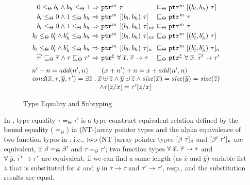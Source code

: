 \begin{DIFnomarkup}
\begin{figure}
{\[\begin{array}{l}
\begin{array}{r@{~}c@{~}l@{~}c@{~}l}
    0\le_{\Theta} b_l \wedge b_h \le_{\Theta} 1 &\Rightarrow& \tptr{\tau}{m}&\sqsubseteq_{\Theta}& \tarrayptr{b_l}{b_h}{\tau}{m}\\[0.2em]
    b_l \le_{\Theta} 0 \wedge 1 \le_{\Theta} b_h &\Rightarrow& \tarrayptr{b_l}{b_h}{\tau}{m} &\sqsubseteq_{\Theta}& \tptr{\tau}{m}\\[0.2em]
    b_l \le_{\Theta} 0 \wedge 1 \le_{\Theta} b_h &\Rightarrow& \tntarrayptr{b_l}{b_h}{\tau}{m} &\sqsubseteq_{\Theta}& \tptr{\tau}{m}\\[0.2em]
    b_l \le_{\Theta} b_l' \wedge b_h' \le_{\Theta} b_h &\Rightarrow& \tntarrayptr{b_l}{b_h}{\tau}{m} &\sqsubseteq_{\Theta}& \tarrayptr{b_l'}{b_h'}{\tau}{m}\\[0.6em]
    b_l \le_{\Theta} b_l' \wedge b_h' \le_{\Theta} b_h &\Rightarrow& \tallarrayptr{b_l}{b_h}{\tau}{m} &\sqsubseteq_{\Theta}& \tallarrayptr{b_l'}{b_h'}{\tau}{m}
\\[0.2em]
\overline{\tau'}\sqsubseteq_{\Theta}\overline{\tau}\wedge \tau\sqsubseteq_{\Theta}\tau' &\Rightarrow& \tptr{\tfun{\overline{x}}{\overline{\tau}}{\tau}}{\xi} &\sqsubseteq_{\Theta}& \tptr{\tfun{\overline{x}}{\overline{\tau'}}{\tau'}}{\xi}

    \end{array}
\end{array}
  \]
}
{\footnotesize
\[
\begin{array}{l}
n'+n = add(n',n)
\qquad
(x+n')+n = x+add(n',n)\\
\textit{cond}(\overline{x},\tau,\overline{y},\tau')
=\exists\overline{z}\;.\;\overline{x}\cupdot\overline{z}
  \wedge \overline{y}\cupdot\overline{z}
  \wedge \size(\overline{x})=\size(\overline{y})=\size(\overline{z})
\\\qquad\qquad\qquad\qquad\qquad
  \wedge \tau[\overline{z}/\overline{x}]= \tau'[\overline{z}/\overline{x}]
\end{array}
\]
}
  \caption{Type Equality and Subtyping}
  \label{fig:checkc-subtype}
\end{figure}
\end{DIFnomarkup}


In \lang, type equality $\tau=_{\Theta}\tau'$
is a type construct equivalent relation defined by the bound equality ($=_{\Theta}$) in (NT-)array pointer types
and the alpha equivalence of two function types in ;
i.e., two (NT-)array pointer types $[{\beta}~{\tau}]_{\kappa} $ and $ [{\beta'}~{\tau'}]_{\kappa}$ are equivalent, if 
$\beta =_{\Theta} \beta'$ and $\tau=_{\Theta}\tau'$; two function types 
$\forall \;\overline{x}.\;{\overline{\tau}}\to\tau $ and $ \forall \;\overline{y}.\;{\overline{\tau'}}\to\tau'$
are equivalent, if we can find a same length (as $\overline{x}$ and $\overline{y}$) variable list $\overline{z}$ that is substituted for $\overline{x}$ and $\overline{y}$ in $\overline{\tau} \to {\tau}$ and $\overline{\tau'} \to {\tau'}$, resp.,
and the substitution results are equal.


